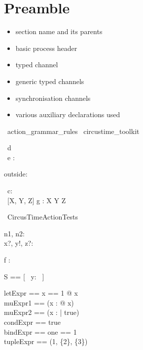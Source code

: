 \documentclass{article}
\begin{document}
\section{Preamble}

\begin{itemize}
   \item section name and its parents
   \item basic process header
   \item typed channel
   \item generic typed channels
   \item synchronisation channels
   \item various auxiliary declarations used
\end{itemize}

\begin{zsection}
  \SECTION\ action\_grammar\_rules \parents\ circustime\_toolkit
\end{zsection}

\begin{circus}
     \circchannel\ d \\
     \circchannel\ e : \nat \\
\end{circus}

\begin{axdef}
    outside: \nat
\end{axdef}

\begin{circus}
   \circchannel\ c: \nat \cross \nat \cross \nat \\
   \circchannel\ [X, Y, Z] g : X \cross Y \cross Z
\end{circus}

\begin{circus}
   \circprocess\ CircusTimeActionTests \circdef \circbegin
\end{circus}

\begin{axdef}
   n1, n2: \nat \\
   x?, y!, z?: \nat
\end{axdef}

\begin{axdef}
   f : \nat \fun \nat \cross \nat
\end{axdef}

\begin{zed}
   S == [~ y: \nat ~]
\end{zed}

\begin{zed}
  letExpr == \LET x == 1 @ x\\
  muExpr1 == (\mu x : \nat @ x)\\
  muExpr2 == (\mu x : \nat | true)\\
  condExpr == \IF true  \\
  bindExpr == \lblot one == 1 \rblot\\
  tupleExpr == (1, \{2\}, \power \{3\})\\
\end{zed}
\end{document}
